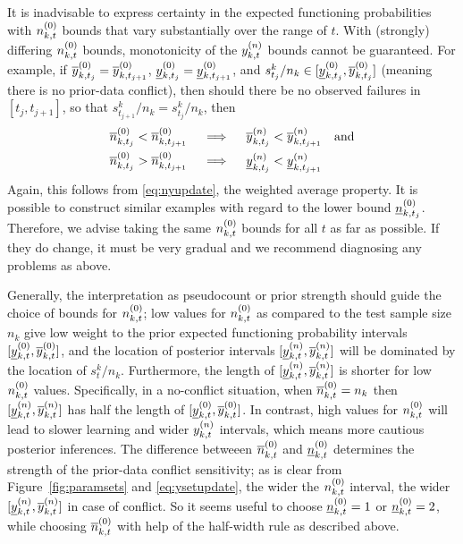 \documentclass[12pt, a4paper]{elsarticle}
\begin{document}
It is inadvisable to express certainty in the expected functioning probabilities
with $n^{(0)}_{k,t}$ bounds that vary substantially over the range of $t$.
With (strongly) differing $n^{(0)}_{k,t}$ bounds, monotonicity of the $y^{(n)}_{k,t}$ bounds cannot be guaranteed.
For example, if $\overline{y}^{(0)}_{k,t_j} = \overline{y}^{(0)}_{k,t_{j+1}}$, $\underline{y}^{(0)}_{k,t_j} = \underline{y}^{(0)}_{k,t_{j+1}}$,
and $s^k_{t_j}/n_k \in [\underline{y}^{(0)}_{k,t_j}, \overline{y}^{(0)}_{k,t_j}]$ (meaning there is no prior-data conflict),
then should there be no observed failures in $[t_j, t_{j+1}]$, so that $s^k_{t_{j+1}}/n_k = s^k_{t_{j}}/n_k$, then
\begin{align*}
  \overline{n}^{(0)}_{k,t_j} < \overline{n}^{(0)}_{k,t_{j+1}} \quad&\implies\quad\overline{y}^{(n)}_{k,t_j} < \overline{y}^{(n)}_{k,t_{j+1}} \quad\mbox{and} \\
  \overline{n}^{(0)}_{k,t_j} > \overline{n}^{(0)}_{k,t_{j+1}} \quad&\implies\quad\underline{y}^{(n)}_{k,t_j} < \underline{y}^{(n)}_{k,t_{j+1}}
\end{align*}
Again, this follows from \eqref{eq:nyupdate}, the weighted average property.
It is possible to construct similar examples with regard to the lower bound $\underline{n}^{(0)}_{k,t_j}$.
Therefore, we advise taking the same $n^{(0)}_{k,t}$ bounds for all $t$ as far as possible.
If they do change, it must be very gradual and we recommend diagnosing 
any problems as above.

Generally, the interpretation as pseudocount or prior strength should guide the choice of bounds for $n^{(0)}_{k,t}$; 
low values for $n^{(0)}_{k,t}$ as compared to the test sample size $n_k$
give low weight to the prior expected functioning probability intervals $[\underline{y}^{(0)}_{k,t}, \overline{y}^{(0)}_{k,t}]$,
and the location of posterior intervals $[\underline{y}^{(n)}_{k,t}, \overline{y}^{(n)}_{k,t}]$ will be dominated by the location of $s^k_t/n_k$.
Furthermore, the length of $[\underline{y}^{(n)}_{k,t}, \overline{y}^{(n)}_{k,t}]$ is shorter for low $n^{(0)}_{k,t}$ values.  Specifically, 
in a no-conflict situation, when $\overline{n}^{(0)}_{k,t} = n_k$ then $[\underline{y}^{(n)}_{k,t}, \overline{y}^{(n)}_{k,t}]$ has half the length of $[\underline{y}^{(0)}_{k,t}, \overline{y}^{(0)}_{k,t}]$.
In contrast, high values for $n^{(0)}_{k,t}$ will lead to slower learning and wider $y^{(n)}_{k,t}$ intervals,
which means more cautious posterior inferences.
The difference betweeen $\overline{n}^{(0)}_{k,t}$ and $\underline{n}^{(0)}_{k,t}$ determines the strength of the prior-data conflict sensitivity;
as is clear from Figure~\ref{fig:paramsets} and \eqref{eq:ysetupdate}, the wider the $n^{(0)}_{k,t}$ interval,
the wider $[\underline{y}^{(n)}_{k,t}, \overline{y}^{(n)}_{k,t}]$ in case of conflict.
So it seems useful to choose $\underline{n}^{(0)}_{k,t} = 1$ or $\underline{n}^{(0)}_{k,t} = 2$,
while choosing $\overline{n}^{(0)}_{k,t}$ with help of the half-width rule as described above.
\end{document}
